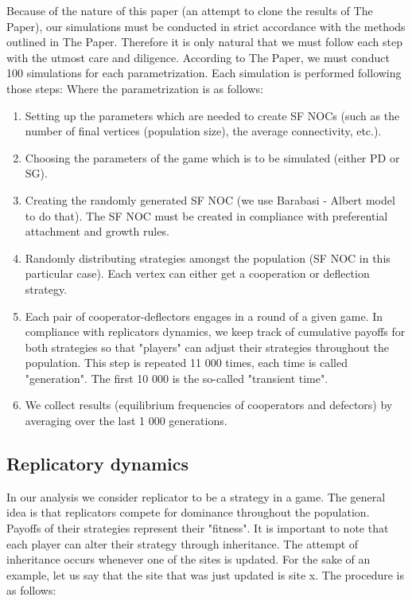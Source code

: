 \documentclass[english, twoside, 12pt, a4paper]{article}
\theoremstyle{definition}
\theoremstyle{plain}
\theoremstyle{remark}
\begin{document}
Because of the nature of this paper (an attempt to clone the results of The Paper), our simulations must be conducted in strict accordance with the methods outlined
in The Paper. Therefore it is only natural that we must follow each step with the utmost care and diligence. According to The Paper, we must conduct 100 simulations 
for each parametrization. Each simulation is performed following those steps: Where the parametrization is as follows:
\begin{enumerate}
  \item Setting up the parameters which are needed to create SF NOCs (such as the number of final vertices (population size), the average connectivity, etc.).
  \item Choosing the parameters of the game which is to be simulated (either PD or SG).
  \item Creating the randomly generated SF NOC (we use Barabasi - Albert model to do that). The SF NOC must be created in compliance with preferential attachment and 
  growth rules.
  \item Randomly distributing strategies amongst the population (SF NOC in this particular case). Each vertex can either get a cooperation or deflection strategy.
  \item Each pair of cooperator-deflectors engages in a round of a given game. In compliance with replicators dynamics, we keep track of cumulative payoffs for both 
  strategies so that "players" can adjust their strategies throughout the population. This step is repeated 11 000 times, each time is called "generation". The first 
  10 000 is the so-called "transient time".
  \item We collect results (equilibrium frequencies of cooperators and defectors) by averaging over the last 1 000 generations.
\end{enumerate}

\subsection{Replicatory dynamics}

In our analysis we consider replicator to be a strategy in a game. The general idea is that replicators compete for dominance throughout the population. Payoffs of
their strategies represent their "fitness". It is important to note that each player can alter their strategy through inheritance. The attempt of inheritance occurs 
whenever one of the sites is updated. For the sake of an example, let us say that the site that was just updated is site x. The procedure is as follows:
\end{document}
